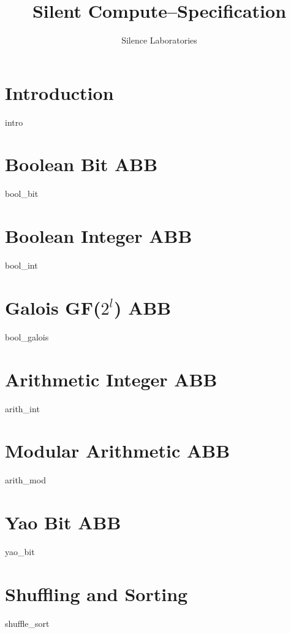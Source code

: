 \documentclass{report}
\begin{document}
\title{Silent Compute--Specification}

\author{Silence Laboratories}
\maketitle

\chapter{Introduction}
{intro}

\chapter{Boolean Bit ABB}
{bool_bit}

\chapter{Boolean Integer ABB}
{bool_int}

\chapter{Galois GF($2^l$) ABB}
{bool_galois}

\chapter{Arithmetic Integer ABB}
{arith_int}

\chapter{Modular Arithmetic ABB}
{arith_mod}

\chapter{Yao Bit ABB}
{yao_bit}

\chapter{Shuffling and Sorting}
{shuffle_sort}



\end{document}
